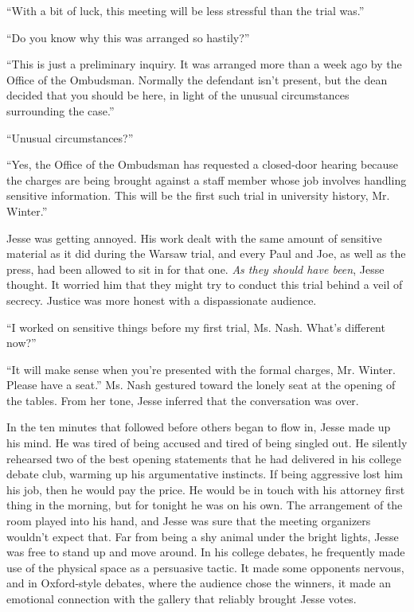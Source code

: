 \documentclass[12pt]{book}
\begin{document}
``With a bit of luck, this meeting will be less stressful than the trial was.''

``Do you know why this was arranged so hastily?''

``This is just a preliminary inquiry.  It was arranged more than a week ago by the Office of the Ombudsman.  Normally the defendant isn't present, but the dean decided that you should be here, in light of the unusual circumstances surrounding the case.''

``Unusual circumstances?''

``Yes, the Office of the Ombudsman has requested a closed-door hearing because the charges are being brought against a staff member whose job involves handling sensitive information.  This will be the first such trial in university history, Mr. Winter.''

Jesse was getting annoyed.  His work dealt with the same amount of sensitive material as it did during the Warsaw trial, and every Paul and Joe, as well as the press, had been allowed to sit in for that one.  \emph{As they should have been}, Jesse thought.  It worried him that they might try to conduct this trial behind a veil of secrecy.  Justice was more honest with a dispassionate audience.

``I worked on sensitive things before my first trial, Ms. Nash.  What's different now?''

``It will make sense when you're presented with the formal charges, Mr. Winter.  Please have a seat.''  Ms. Nash gestured toward the lonely seat at the opening of the tables.  From her tone, Jesse inferred that the conversation was over.

In the ten minutes that followed before others began to flow in, Jesse made up his mind.  He was tired of being accused and tired of being singled out.  He silently rehearsed two of the best opening statements that he had delivered in his college debate club, warming up his argumentative instincts.  If being aggressive lost him his job, then he would pay the price.  He would be in touch with his attorney first thing in the morning, but for tonight he was on his own.  The arrangement of the room played into his hand, and Jesse was sure that the meeting organizers wouldn't expect that.  Far from being a shy animal under the bright lights, Jesse was free to stand up and move around.  In his college debates, he frequently made use of the physical space as a persuasive tactic.  It made some opponents nervous, and in Oxford-style debates, where the audience chose the winners, it made an emotional connection with the gallery that reliably brought Jesse votes.
\end{document}

